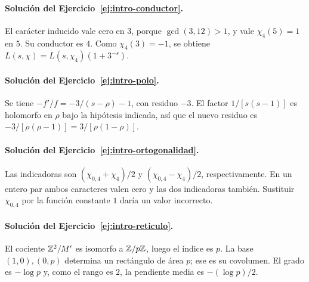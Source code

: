 \paragraph{Solución del Ejercicio~\ref{ej:intro-conductor}.}
El carácter inducido vale cero en $3$, porque $\gcd(3,12)>1$, y vale
$\chi_4(5)=1$ en $5$. Su conductor es $4$. Como $\chi_4(3)=-1$,
se obtiene $L(s,\chi)=L(s,\chi_4)(1+3^{-s})$.

\paragraph{Solución del Ejercicio~\ref{ej:intro-polo}.}
Se tiene $-f'/f=-3/(s-\rho)-1$, con residuo $-3$. El factor
$1/[s(s-1)]$ es holomorfo en $\rho$ bajo la hipótesis indicada, así que
el nuevo residuo es $-3/[\rho(\rho-1)]=3/[\rho(1-\rho)]$.

\paragraph{Solución del Ejercicio~\ref{ej:intro-ortogonalidad}.}
Las indicadoras son $(\chi_{0,4}+\chi_4)/2$ y
$(\chi_{0,4}-\chi_4)/2$, respectivamente. En un entero par ambos
caracteres valen cero y las dos indicadoras también. Sustituir
$\chi_{0,4}$ por la función constante $1$ daría un valor incorrecto.

\paragraph{Solución del Ejercicio~\ref{ej:intro-reticulo}.}
El cociente $\mathbb{Z}^2/M'$ es isomorfo a $\mathbb{Z}/p\mathbb{Z}$, luego el índice es $p$.
La base $(1,0),(0,p)$ determina un rectángulo de área $p$; ese es su
covolumen. El grado es $-\log p$ y, como el rango es $2$, la pendiente
media es $-(\log p)/2$.
